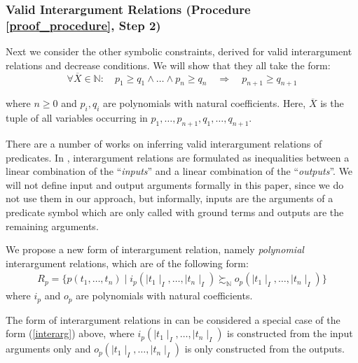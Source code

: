 \documentclass[envcountsame]{tlp}
\newcounter{polycons2ctr}
\newcounter{polycons1ctr}
\newcounter{ex:der-lastsymconsctr}
\begin{document}
\subsubsection{Valid Interargument Relations (Procedure \ref{proof_procedure}, Step 2)}
\label{Valid_Interargument_Relations}
\hspace*{\fill}

\vspace*{.2cm}

\noindent
Next we consider the other symbolic constraints, derived for valid interargument 
relations and decrease conditions. We will show that they all take the form:
\setcounter{polycons2ctr}{\value{equation}}
\begin{equation}
\forall \overline{X} \in \mathbb{N}: \quad p_1 \ge q_1 \wedge \ldots \wedge
p_n \ge q_n \quad \Rightarrow \quad p_{n+1} \ge q_{n+1} \label{polycons2}
\end{equation}

\noindent
where $n \ge 0$ and $p_i, q_i$ are polynomials with natural
coefficients. Here, $\overline{X}$ is the tuple of all variables occurring in $p_1, \ldots,
p_{n+1}, q_1, \ldots, q_{n+1}$.


There are a number
of works on inferring valid interargument relations of predicates. In
\cite{Decorteetal98}, interargument relations are
formulated as inequalities between a linear
combination of the ``\textit{inputs}'' and a linear combination of the
``\textit{outputs}''. We will not define input and output arguments formally in this paper,
since we do not use them in our approach, but informally, inputs are the arguments of a
predicate symbol which are only called with ground terms and outputs are the remaining arguments.

We propose a new form of interargument relation, namely
\emph{polynomial}
interargument relations, which are of the following form: 
\begin{align}
    R_p = \{p(t_1,\ldots, t_n) \mid i_p({\mid}t_1{\mid}_I,\ldots,
{\mid}t_n{\mid}_I)   \succsim_\mathbb{N}  o_p({\mid}t_1{\mid}_I,\ldots,
{\mid}t_n{\mid}_I)\} \label{interarg} 
\end{align}
where $i_p$ and $o_p$ are polynomials with natural coefficients.

The form of interargument relations in \cite{Decorteetal98} can be
considered a special case of the form (\ref{interarg}) above, 
where $i_p({\mid}t_1{\mid}_I,\ldots,
{\mid}t_n{\mid}_I)$ is constructed from the
input arguments only and $o_p({\mid}t_1{\mid}_I,\ldots,
{\mid}t_n{\mid}_I)$ is only constructed from the
outputs.
\end{document}
